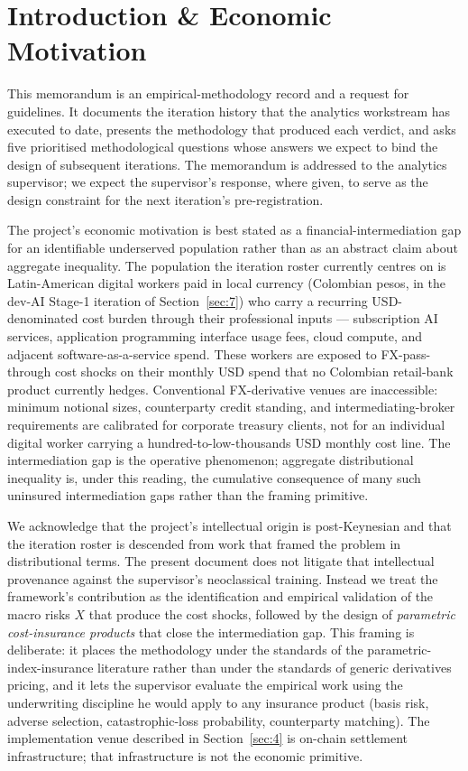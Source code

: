 \section{Introduction \& Economic Motivation}\label{sec:1}

This memorandum is an empirical-methodology record and a request for
guidelines. It documents the iteration history that the analytics workstream
has executed to date, presents the methodology that produced each verdict,
and asks five prioritised methodological questions whose answers we expect to
bind the design of subsequent iterations. The memorandum is addressed to the
analytics supervisor; we expect the supervisor's response, where given, to
serve as the design constraint for the next iteration's pre-registration.

The project's economic motivation is best stated as a financial-intermediation
gap for an identifiable underserved population rather than as an abstract
claim about aggregate inequality. The population the iteration roster
currently centres on is Latin-American digital workers paid in local
currency (Colombian pesos, in the dev-AI Stage-1 iteration of
Section~\ref{sec:7}) who carry a recurring USD-denominated cost burden
through their professional inputs --- subscription AI services, application
programming interface usage fees, cloud compute, and adjacent
software-as-a-service spend. These workers are exposed to FX-pass-through
cost shocks on their monthly USD spend that no Colombian retail-bank
product currently hedges. Conventional FX-derivative venues are
inaccessible: minimum notional sizes, counterparty credit standing, and
intermediating-broker requirements are calibrated for corporate treasury
clients, not for an individual digital worker carrying a
hundred-to-low-thousands USD monthly cost line. The intermediation gap is
the operative phenomenon; aggregate distributional inequality is, under
this reading, the cumulative consequence of many such uninsured
intermediation gaps rather than the framing primitive.

We acknowledge that the project's intellectual origin is post-Keynesian and
that the iteration roster is descended from work that framed the problem in
distributional terms. The present document does not litigate that
intellectual provenance against the supervisor's neoclassical training.
Instead we treat the framework's contribution as the identification and
empirical validation of the macro risks \(X\) that produce the cost shocks,
followed by the design of \emph{parametric cost-insurance products} that
close the intermediation gap. This framing is deliberate: it places the
methodology under the standards of the parametric-index-insurance
literature \citep{carter_etal_2017,mahul_stutley_2010,clarke_2016} rather
than under the standards of generic derivatives pricing, and it lets the
supervisor evaluate the empirical work using the underwriting discipline he
would apply to any insurance product (basis risk, adverse selection,
catastrophic-loss probability, counterparty matching). The implementation
venue described in Section~\ref{sec:4} is on-chain settlement
infrastructure; that infrastructure is not the economic primitive.

